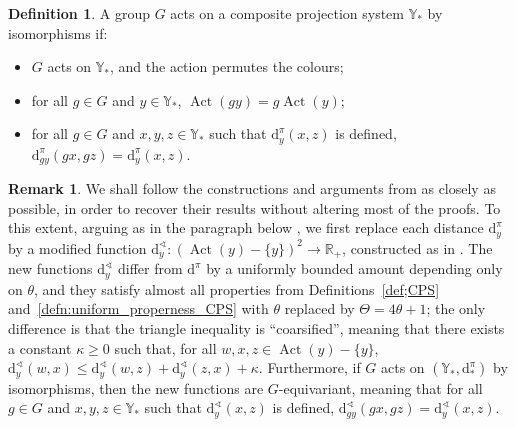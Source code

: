 \documentclass[svgnames]{amsart}
\theoremstyle{plain}
\theoremstyle{definition}
\newtheorem{defn}[thm]{Definition}
\newtheorem{rem}[thm]{Remark}
\newcommand{\dist}{\mathrm{d}}
\newcommand{\Act}{\operatorname{Act}}
\renewcommand{\angle}{\sphericalangle}
\begin{document}
\begin{defn}\label{defn:group_action_on_CPS}
    A group $G$ acts on a composite projection system $\mathbb{Y}_*$ by isomorphisms if:
    \begin{itemize}
        \item $G$ acts on $\mathbb{Y}_*$, and the action permutes the colours;
        \item for all $g\in G$ and $y\in\mathbb{Y}_*$, $\Act(gy)=g\Act(y)$;
        \item for all $g\in G$ and $x,y,z\in \mathbb{Y}_*$ such that $\dist^\pi_y(x,z)$ is defined, $\dist^\pi_{gy}(gx,gz)=\dist^\pi_y(x,z)$.
    \end{itemize}  
\end{defn}

\begin{rem}\label{rem:d^angle} We shall follow the constructions and arguments from \cite{dfdt} as closely as possible, in order to recover their results without altering most of the proofs. To this extent, arguing as in the paragraph below \cite[Definition 1.1]{dfdt}, we first replace each distance $\dist^\pi_y$ by a modified function $\dist_y^\angle\colon (\Act(y) -\{y\})^2 \to \mathbb{R}_+$, constructed as in \cite[Theorem 3.3]{BBF}. The new functions $\dist_y^\angle$ differ from $\dist^\pi$ by a uniformly bounded amount depending only on $\theta$, and they satisfy almost all properties from Definitions~\ref{def;CPS} and~\ref{defn:uniform_properness_CPS} with $\theta$ replaced by $\Theta=4\theta+1$; the only difference is that the triangle inequality is ``coarsified'', meaning that there exists a constant $\kappa\ge 0$ such that, for all $w,x,z\in\Act(y)-\{y\}$, $\dist^\angle_y(w,x)\le \dist^\angle_y(w,z)+\dist^\angle_y(z,x)+\kappa$. Furthermore, if $G$ acts on $(\mathbb{Y}_*,\dist^\pi_*)$ by isomorphisms, then the new functions are $G$-equivariant, meaning that for all $g\in G$ and $x,y,z\in \mathbb{Y}_*$ such that $\dist^\angle_y(x,z)$ is defined, $\dist^\angle_{gy}(gx,gz)=\dist^\angle_y(x,z)$.
    \end{rem}
\end{document}

